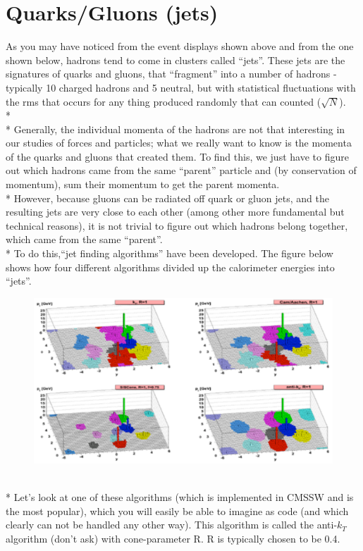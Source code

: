 \section{Quarks/Gluons (jets)}
As you may have noticed from the event displays shown above and from the one shown below, hadrons tend to come in clusters called ``jets''. These jets are the signatures of quarks and gluons, that ``fragment'' into a number of hadrons - typically 10 charged hadrons and 5 neutral, but with statistical fluctuations with the rms that occurs for any thing produced randomly that can counted ($\sqrt{N}$).
\\*
\\*
Generally, the individual momenta of the hadrons are not that interesting in our studies of forces and particles; what we really want to know is the momenta of the quarks and gluons that created them. To find this, we just have to figure out which hadrons came from the same ``parent'' particle and (by conservation of momentum), sum their momentum to get the parent momenta.
\\*
\noindent
However, because gluons can be radiated off quark or gluon jets, and the resulting jets are very close to each other (among other more fundamental but technical reasons), it is not trivial to figure out which hadrons belong together, which came from the same ``parent''.
\\*
To do this,``jet finding algorithms'' have been developed. The figure below shows how four different algorithms divided up the calorimeter energies into ``jets''.
\begin{figure}[h]
\centering\includegraphics[scale=0.6]{./particleID/Pictures/fig5.pdf}
\end{figure}
\\*
\noindent
Let's look at one of these algorithms (which is implemented in CMSSW and is the most popular), which you will easily be able to imagine as code (and which clearly can not be handled any other way).  This algorithm is called the anti-$k_{T}$ algorithm (don't ask) with cone-parameter R. R is typically chosen to be 0.4.
